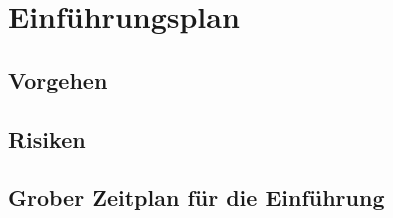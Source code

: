 \section{Einführungsplan}
\subsection{Vorgehen}
\subsection{Risiken}
\subsection{Grober Zeitplan für die Einführung}
